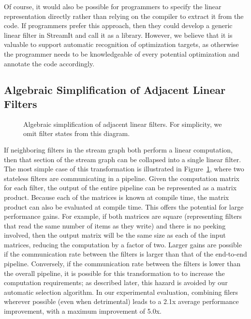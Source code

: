 Of course, it would also be possible for programmers to specify the
linear representation directly rather than relying on the compiler to
extract it from the code.  If programmers prefer this approach, then
they could develop a generic linear filter in StreamIt and call it as
a library.  However, we believe that it is valuable to support
automatic recognition of optimization targets, as otherwise the
programmer needs to be knowledgeable of every potential optimization
and annotate the code accordingly.

\subsection*{Algebraic Simplification of Adjacent Linear Filters}

\begin{figure}[t]
\centering
{}
\caption[Algebraic simplification of adjacent linear filters]{Algebraic 
simplification of adjacent linear filters.  For simplicity, we omit
filter states from this diagram.\protect\label{fig:combination}}
\end{figure}

If neighboring filters in the stream graph both perform a linear
computation, then that section of the stream graph can be collapsed
into a single linear filter.  The most simple case of this
transformation is illustrated in Figure~\ref{fig:combination}, where
two stateless filters are communicating in a pipeline.  Given the
computation matrix for each filter, the output of the entire pipeline
can be represented as a matrix product.  Because each of the matrices
is known at compile time, the matrix product can also be evaluated at
compile time.  This offers the potential for large performance gains.
For example, if both matrices are square (representing filters that
read the same number of items as they write) and there is no peeking
involved, then the output matrix will be the same size as each of the
input matrices, reducing the computation by a factor of two.  Larger
gains are possible if the communication rate between the filters is
larger than that of the end-to-end pipeline.  Conversely, if the
communication rate between the filters is lower than the overall
pipeline, it is possible for this transformation to to increase the
computation requirements; as described later, this hazard is avoided
by our automatic selection algorithm.  In our experimental evaluation,
combining filers wherever possible (even when detrimental) leads to a
2.1x average performance improvement, with a maximum improvement of
5.0x.

